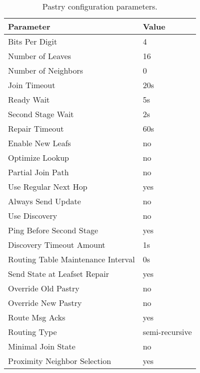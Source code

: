 \begin{table}[htbp]
\centering
\begin{tabular}{|l|l|}
\hline
Parameter                       & Value\\
\hline
Bits Per Digit                  & 4\\
Number of Leaves                & 16\\
Number of Neighbors             & 0\\
Join Timeout                    & 20s\\
Ready Wait                      & 5s\\
Second Stage Wait               & 2s\\
Repair Timeout                  & 60s\\
Enable New Leafs                & no\\
Optimize Lookup                 & no\\
Partial Join Path               & no\\
Use Regular Next Hop            & yes\\
Always Send Update              & no\\
Use Discovery                   & no\\
Ping Before Second Stage        & yes\\
Discovery Timeout Amount        & 1s\\
Routing Table Maintenance Interval & 0s\\
Send State at Leafset Repair    & yes\\
Override Old Pastry             & no\\
Override New Pastry             & no\\
Route Msg Acks                  & yes\\
Routing Type                    & semi-recursive\\
Minimal Join State              & no\\
Proximity Neighbor Selection    & yes\\
\hline
\end{tabular}
\caption{Pastry configuration parameters.}
\label{tab_pastry_configs}
\end{table}

